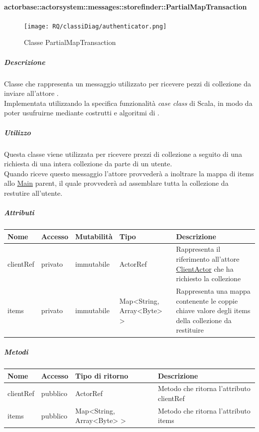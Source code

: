 \documentclass{scalatekids-article}
\begin{document}
\paragraph{actorbase::actorsystem::messages::storefinder::PartialMapTransaction}
\label{sec:actorbase::actorsystem::messages::storefinder::PartialMapTransaction}

\begin{figure}[H]
  \begin{center}
    \texttt{[image: RQ/classiDiag/authenticator.png]}
    \caption{Classe PartialMapTransaction}
  \end{center}
\end{figure}

\subparagraph{Descrizione}
Classe che rappresenta un messaggio utilizzato per ricevere pezzi di collezione da inviare all'attore .\\Implementata utilizzando la specifica funzionalità \textit{case class} di Scala,
in modo da poter usufruirne mediante costrutti e algoritmi di
.

\subparagraph{Utilizzo}
Questa classe viene utilizzata per ricevere prezzi di collezione a seguito di
una richiesta di una intera collezione da parte di un utente.\\Quando riceve questo messaggio l'attore provvederà a inoltrare la mappa di items allo
\hyperref[sec:actorbase::actorsystem::actors::main::Main]{Main} parent, il quale provvederà ad assemblare tutta la collezione da restutire all'utente.

\subparagraph{Attributi}
\begin{tabular}{| p{2cm} | p{1.5cm} | p{2cm} | p{3cm} | p{8.5cm} |}
  \hline
  Nome & Accesso & Mutabilità & Tipo & Descrizione\\
  \hline
  clientRef & privato & immutabile & ActorRef & Rappresenta il riferimento all'attore \hyperref[sec:actorbase::actorsystem::actors::clientactor::ClientActor]{ClientActor} che ha richiesto la collezione\\
  \hline
  items & privato & immutabile & Map<String, Array<Byte> > & Rappresenta una mappa contenente le coppie chiave valore degli items della collezione da restituire\\
  \hline
\end{tabular}

\subparagraph{Metodi}
\begin{tabular}{| l | l | l | l |}
  \hline
  Nome & Accesso & Tipo di ritorno & Descrizione\\
  \hline
  clientRef & pubblico & ActorRef & Metodo che ritorna l'attributo clientRef\\
  \hline
  items & pubblico & Map<String, Array<Byte> > & Metodo che ritorna l'attributo items\\
  \hline
\end{tabular}
\end{document}
